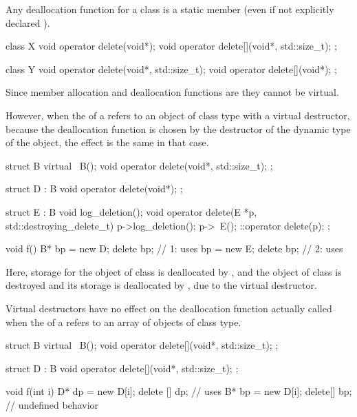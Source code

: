 \pnum
{}%
%
Any deallocation function for a class
is a static member (even if not explicitly declared
).
\begin{example}
\begin{codeblock}
class X {
  void operator delete(void*);
  void operator delete[](void*, std::size_t);
};

class Y {
  void operator delete(void*, std::size_t);
  void operator delete[](void*);
};
\end{codeblock}
\end{example}

\pnum
Since member allocation and deallocation functions are
they cannot be virtual.
\begin{note}
However, when the
of a
refers to an object of class type with a virtual destructor,
because the deallocation function is chosen by the destructor
of the dynamic type of the object, the effect is the same in that case.
\begin{example}
\begin{codeblock}
struct B {
  virtual ~B();
  void operator delete(void*, std::size_t);
};

struct D : B {
  void operator delete(void*);
};

struct E : B {
  void log_deletion();
  void operator delete(E *p, std::destroying_delete_t) {
    p->log_deletion();
    p->~E();
    ::operator delete(p);
  }
};

void f() {
  B* bp = new D;
  delete bp;        // 1: uses 
  bp = new E;
  delete bp;        // 2: uses 
}
\end{codeblock}
Here, storage for the object of class
is deallocated by
,
and
the object of class  is destroyed
and its storage is deallocated
by ,
due to the virtual destructor.
\end{example}
\end{note}
\begin{note}
Virtual destructors have no effect on the deallocation function actually
called when the
of a
refers to an array of objects of class type.
\begin{example}
\begin{codeblock}
struct B {
  virtual ~B();
  void operator delete[](void*, std::size_t);
};

struct D : B {
  void operator delete[](void*, std::size_t);
};

void f(int i) {
  D* dp = new D[i];
  delete [] dp;     // uses 
  B* bp = new D[i];
  delete[] bp;      // undefined behavior
}
\end{codeblock}
\end{example}
\end{note}

